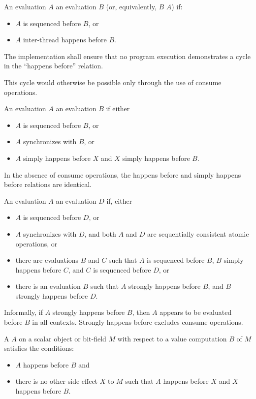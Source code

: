 \pnum
An evaluation $A$  an evaluation $B$
(or, equivalently, $B$  $A$) if:
\begin{itemize}
\item $A$ is sequenced before $B$, or
\item $A$ inter-thread happens before $B$.
\end{itemize}
The implementation shall ensure that no program execution demonstrates a cycle
in the ``happens before'' relation.
\begin{note}
This cycle would otherwise be
possible only through the use of consume operations.
\end{note}

\pnum
An evaluation $A$  an evaluation $B$
if either
\begin{itemize}
\item $A$ is sequenced before $B$, or
\item $A$ synchronizes with $B$, or
\item $A$ simply happens before $X$ and
$X$ simply happens before $B$.
\end{itemize}
\begin{note}
In the absence of consume operations,
the happens before and simply happens before relations are identical.
\end{note}

\pnum
An evaluation $A$ 
an evaluation $D$ if, either
\begin{itemize}
\item $A$ is sequenced before $D$, or
\item $A$ synchronizes with $D$, and
both $A$ and $D$ are
sequentially consistent atomic operations, or
\item there are evaluations $B$ and $C$
such that $A$ is sequenced before $B$,
$B$ simply happens before $C$, and
$C$ is sequenced before $D$, or
\item there is an evaluation $B$ such that
$A$ strongly happens before $B$, and
$B$ strongly happens before $D$.
\end{itemize}
\begin{note}
Informally, if $A$ strongly happens before $B$,
then $A$ appears to be evaluated before $B$
in all contexts. Strongly happens before excludes consume operations.
\end{note}

\pnum
A  $A$ on a scalar object or bit-field $M$
with respect to a value computation $B$ of $M$ satisfies the
conditions:
\begin{itemize}
\item $A$ happens before $B$ and
\item there is no other
%
side effect $X$ to $M$ such that $A$
happens before $X$ and $X$ happens before $B$.
\end{itemize}

